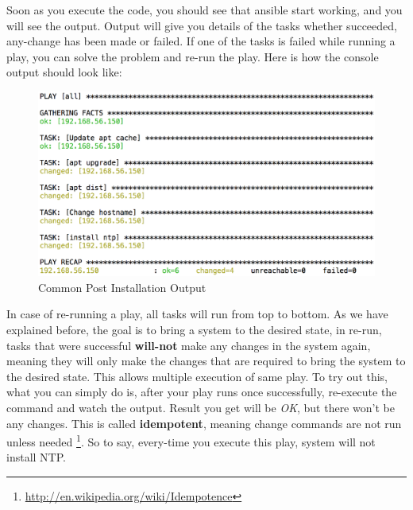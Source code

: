 \documentclass[10pt]{book}
\begin{document}
Soon as you execute the code, you should see that ansible start working, and you 
will see the output. Output will give you details of the tasks whether succeeded, 
any-change has been made or failed. If one of the tasks is failed while running a play, 
you can solve the problem and re-run the play. Here is how the console output should look like:


\begin{figure}[ht]
	\centering
  \includegraphics[width=1.0\textwidth]{figures/common-post-installation-output.eps}
	\caption{Common Post Installation Output}
\end{figure}

In case of re-running a play, all tasks will run from top to bottom. As we have 
explained before, the goal is to bring a system to the desired state, in re-run, 
tasks that were successful \textbf{will-not} make any changes in the system again, 
meaning they will only make the changes that are required to bring the system to the desired 
state. This allows multiple execution of same play. To try out this, what you 
can simply do is, after your play runs once successfully, re-execute the command 
and watch the output. Result you get will be \textit{OK}, but there won't be 
any changes. This is called \textbf{idempotent}, meaning change commands are not run unless 
needed \footnote {\url{http://en.wikipedia.org/wiki/Idempotence}}. So to say, every-time you execute this play, system will not install 
NTP.
\end{document}
